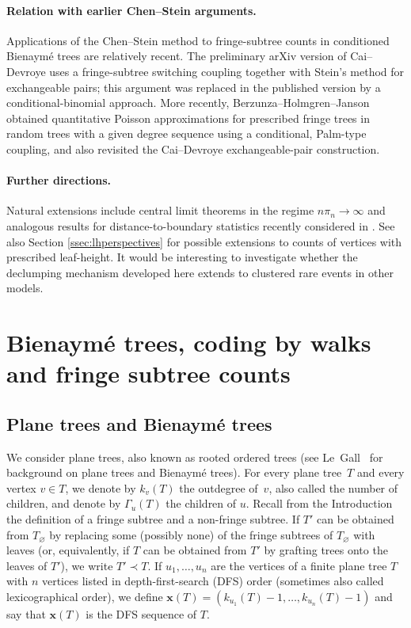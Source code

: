 \documentclass[a4paper,11pt]{article}
\DeclareRobustCommand{\1}{\mathbf{1}}
\begin{document}
\paragraph{Relation with earlier Chen--Stein arguments.} Applications of the Chen--Stein method to fringe-subtree counts in conditioned
Bienaym\'e trees are relatively recent. The preliminary arXiv version of
Cai--Devroye \cite{CD16} uses a fringe-subtree switching coupling together
with Stein's method for exchangeable pairs; this argument was replaced in the
published version \cite{CD17} by a conditional-binomial approach. More
recently, Berzunza--Holmgren--Janson \cite{BHJ26} obtained quantitative
Poisson approximations for prescribed fringe trees in random trees with a
given degree sequence using a conditional, Palm-type coupling, and also
revisited the Cai--Devroye exchangeable-pair construction.
  

\paragraph{Further directions.} Natural extensions include central limit theorems in the regime
$n\pi_n\to\infty$ and analogous results for distance-to-boundary statistics
recently considered in \cite{MS26}. See also
Section \ref{ssec:lhperspectives} for possible extensions to counts of vertices
with prescribed leaf-height. It would be interesting to investigate whether the declumping mechanism developed here extends to clustered rare events in other models.


\tableofcontents



\section{Bienaymé trees, coding by walks and fringe subtree counts}\label{sec:BGW}

\subsection{Plane trees and Bienaym\'e trees}
\label{sec:bgw_trees}

We consider plane trees, also known as rooted ordered trees (see Le~Gall~\cite[Sec.~1]{LG05} for background on plane trees and Bienaymé trees). For every plane tree~$T$ and every vertex $v \in T$, we denote by $k_v(T)$ the outdegree of~$v$, also called the number of children, and denote by $\Gamma_{u}(T)$ the children of $u$. Recall from the Introduction the definition of a fringe subtree and a non-fringe subtree. If $T'$ can be obtained from $T_\varnothing$ by replacing some (possibly none) of the fringe subtrees of $T_\varnothing$ with leaves (or, equivalently, if $T$ can be obtained from $T'$ by grafting trees onto the leaves of $T'$), we write $T' \prec T$. If $u_{1}, \ldots, u_{n}$ are the vertices of a finite plane tree $T$ with $n$ vertices listed in depth-first-search (DFS) order (sometimes also called lexicographical order), we define  $\mathbf{x}(T)=(k_{u_{1}}(T)-1, \ldots,  k_{u_{n}}(T)-1)$ and say that $\mathbf{x}(T)$ is the DFS sequence of $T$. 
\end{document}
